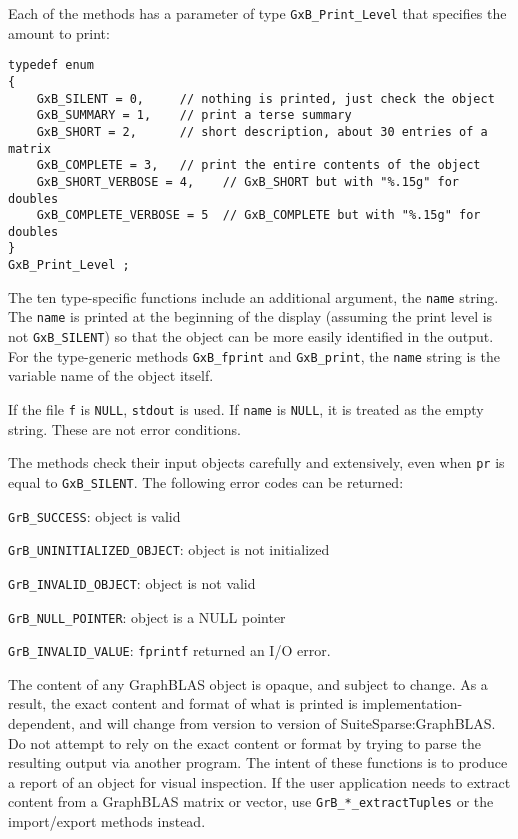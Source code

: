 \documentclass[12pt]{article}
\newenvironment{packed_itemize}{
\begin{itemize}
  \setlength{\itemsep}{1pt}
  \setlength{\parskip}{0pt}
  \setlength{\parsep}{0pt}
}{\end{itemize}}
\begin{document}
{Each of the methods has a parameter of type \verb'GxB_Print_Level' that
specifies the amount to print:

{\footnotesize
\begin{verbatim}
typedef enum
{
    GxB_SILENT = 0,     // nothing is printed, just check the object
    GxB_SUMMARY = 1,    // print a terse summary
    GxB_SHORT = 2,      // short description, about 30 entries of a matrix
    GxB_COMPLETE = 3,   // print the entire contents of the object
    GxB_SHORT_VERBOSE = 4,    // GxB_SHORT but with "%.15g" for doubles
    GxB_COMPLETE_VERBOSE = 5  // GxB_COMPLETE but with "%.15g" for doubles
}
GxB_Print_Level ; \end{verbatim}}

The ten type-specific functions include an additional argument, the
\verb'name' string.  The \verb'name' is printed at the beginning of the display
(assuming the print level is not \verb'GxB_SILENT') so that the object can be
more easily identified in the output.  For the type-generic methods
\verb'GxB_fprint' and \verb'GxB_print', the \verb'name' string is the variable
name of the object itself.

If the file \verb'f' is \verb'NULL', \verb'stdout' is used.
If \verb'name' is \verb'NULL', it is treated
as the empty string.  These are not error conditions.

The methods check their input objects carefully and extensively, even when
\verb'pr' is equal to \verb'GxB_SILENT'.  The following error codes can be
returned:

\begin{packed_itemize}
\item \verb'GrB_SUCCESS':               object is valid
\item \verb'GrB_UNINITIALIZED_OBJECT':  object is not initialized
\item \verb'GrB_INVALID_OBJECT':        object is not valid
\item \verb'GrB_NULL_POINTER':          object is a NULL pointer
\item \verb'GrB_INVALID_VALUE':         \verb'fprintf' returned an I/O error.
\end{packed_itemize}

The content of any GraphBLAS object is opaque, and subject to change.  As a
result, the exact content and format of what is printed is
implementation-dependent, and will change from version to version of
SuiteSparse:GraphBLAS.  Do not attempt to rely on the exact content or format
by trying to parse the resulting output via another program.  The intent of
these functions is to produce a report of an object for visual inspection.  If
the user application needs to extract content from a GraphBLAS matrix or
vector, use \verb'GrB_*_extractTuples' or the import/export methods instead.

}
\end{document}
